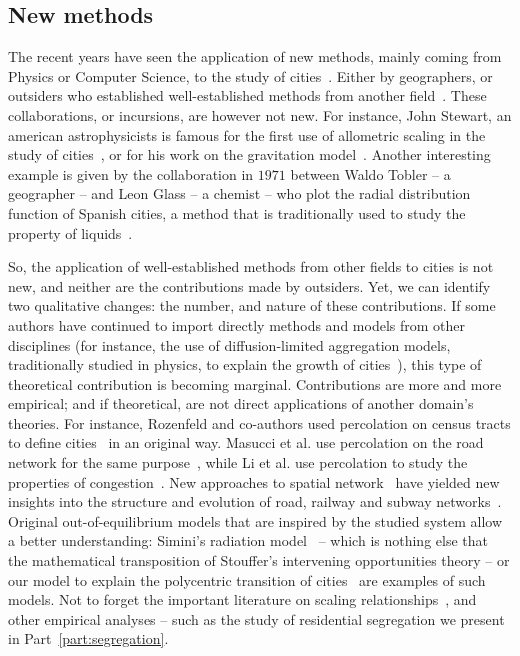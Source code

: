 \subsection{New methods}
\label{sub:new_methods}

The recent years have seen the application of new methods, mainly coming from
Physics or Computer Science, to the study of cities~\cite{Dupuy:2015}. Either by geographers, or
outsiders who established well-established methods from another
field~\cite{Batty:1995}. These collaborations, or incursions, are however not
new. For instance, John Stewart, an american astrophysicists is famous for the first use of allometric
scaling in the study of cities~\cite{Stewart:1947}, or for his work 
on the gravitation model~\cite{Stewart:1948}. Another interesting example is
given by the collaboration in $1971$ between Waldo Tobler -- a geographer -- and
Leon Glass -- a chemist -- who plot the radial distribution function of Spanish
cities, a method that is traditionally used to study the property of
liquids~\cite{Glass:1971}.

So, the application of well-established methods from other fields to cities is
not new, and neither are the contributions made by outsiders. Yet, we can
identify two qualitative changes: the number, and nature of these contributions.
If some authors have continued to import directly methods and models from other
disciplines (for instance, the use of diffusion-limited aggregation models,
traditionally studied in physics, to explain the growth of
cities~\cite{Makse:1995}), this type of theoretical contribution is becoming
marginal. Contributions are more and more empirical; and if theoretical, are not
direct applications of another domain's theories. For
instance, Rozenfeld and co-authors used percolation on census tracts to define
cities~\cite{Rozenfeld:2008} in an original way. Masucci et al. use percolation
on the road network for the same purpose~\cite{Masucci:2015}, while Li et al.
use percolation to study the properties of congestion~\cite{Li:2015}. New
approaches to spatial network~\cite{Barthelemy:2011} have yielded new insights
into the structure and evolution of road, railway and subway networks~\cite{Strano:2012,
Barthelemy:2013,Louf:2013_emergence,Louf:2014_scaling,Louf:2014}.
Original out-of-equilibrium models that are inspired by the studied system allow
a better understanding: Simini's radiation model~\cite{Simini:2012,Simini:2013}
 -- which is nothing else that the mathematical transposition of Stouffer's
 intervening opportunities theory -- or our model to explain the polycentric
 transition of cities~\cite{Louf:2013_polycentric} are examples of such models.
 Not to forget the important literature on scaling
 relationships~\cite{Bettencourt:2007, Bettencourt:2013, Louf:2014_mobility,
 Arcaute:2014, Louf:2014_smog}, and other empirical analyses -- such as the
 study of residential segregation we present in Part~\ref{part:segregation}.

